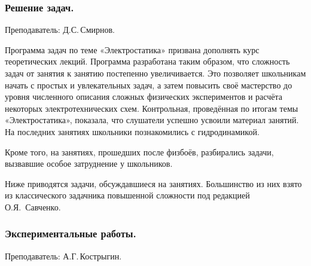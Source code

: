 \documentclass[12pt,a4paper,oneside,draft]{scrartcl}
\begin{document}
\subsubsection{Решение задач.}
\label{sec:daily_10_problems}

\textsf{Преподаватель: Д.С.\,Смирнов.}
\smallskip

Программа задач по теме «Электростатика» призвана дополнять курс
теоретических лекций. Программа разработана таким образом, что
сложность задач от занятия к занятию постепенно увеличивается. Это
позволяет школьникам начать с простых и увлекательных задач, а затем
повысить своё мастерство до уровня численного описания сложных
физических экспериментов и расчёта некоторых электротехнических
схем. Контрольная, проведённая по итогам темы «Электростатика»,
показала, что слушатели успешно усвоили материал занятий. На последних
занятиях школьники познакомились с гидродинамикой.

Кроме того, на занятиях, прошедших после физбоёв, разбирались задачи,
вызвавшие особое затруднение у школьников. 

Ниже приводятся задачи, обсуждавшиеся на занятиях. Большинство из них
взято из классического задачника повышенной сложности под редакцией
О.Я.~Савченко. 










\parindent=5mm

\subsubsection{Экспериментальные работы.}
\label{sec:daily_10_exp}

\textsf{Преподаватель: А.Г.\,Кострыгин.}
\end{document}
